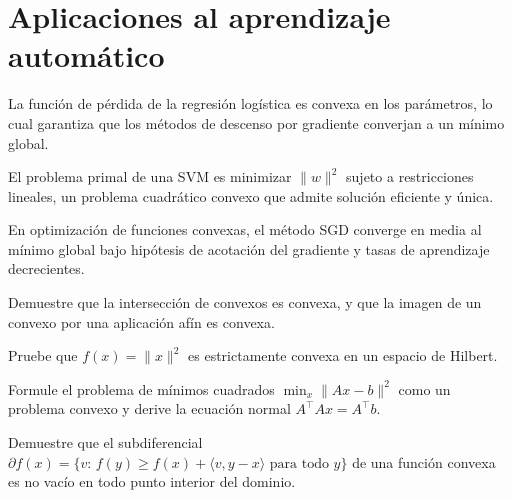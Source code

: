 \section{Aplicaciones al aprendizaje automático}

\begin{example}
\label{ej:regresion-logistica}
La función de pérdida de la regresión logística es convexa en los parámetros, lo cual garantiza que los métodos de descenso por gradiente converjan a un mínimo global.
\end{example}

\begin{example}
\label{ej:svm}
El problema primal de una SVM es minimizar $\|w\|^2$ sujeto a restricciones lineales, un problema cuadrático convexo que admite solución eficiente y única.
\end{example}

\begin{example}
\label{ej:sgd}
En optimización de funciones convexas, el método SGD converge en media al mínimo global bajo hipótesis de acotación del gradiente y tasas de aprendizaje decrecientes.
\end{example}

\begin{exercise}
Demuestre que la intersección de convexos es convexa, y que la imagen de un convexo por una aplicación afín es convexa.
\end{exercise}

\begin{exercise}
Pruebe que $f(x)=\|x\|^2$ es estrictamente convexa en un espacio de Hilbert.
\end{exercise}

\begin{exercise}
Formule el problema de mínimos cuadrados $\min_x\|Ax-b\|^2$ como un problema convexo y derive la ecuación normal $A^\top Ax=A^\top b$.
\end{exercise}

\begin{problem}
Demuestre que el subdiferencial $\partial f(x)=\{v:\,f(y)\geq f(x)+\langle v,y-x\rangle\text{ para todo }y\}$ de una función convexa es no vacío en todo punto interior del dominio.
\end{problem}
